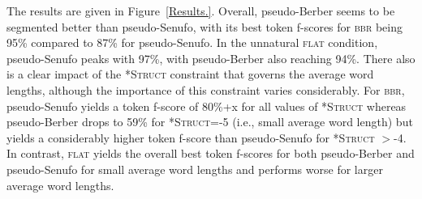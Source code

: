 \documentclass[11pt]{article}
\begin{document}
The results are given in Figure~\ref{Results.}. Overall, pseudo-Berber seems to be segmented better than pseudo-Senufo, with its best token f-scores for \textsc{bbr} being 95\% compared to 87\% for pseudo-Senufo. In the unnatural \textsc{flat} condition, pseudo-Senufo peaks with 97\%, with pseudo-Berber also reaching 94\%. There also is a clear impact of the \textsc{*Struct} constraint that governs the average word lengths, although the importance of this constraint varies considerably. For \textsc{bbr}, pseudo-Senufo yields a token f-score of 80\%+x for all values of \textsc{*Struct} whereas pseudo-Berber drops to 59\% for \textsc{*Struct}=-5 (i.e., small average word length) but yields a considerably higher token f-score than pseudo-Senufo for \textsc{*Struct} $>$-4. In contrast, \textsc{flat} yields the overall best token f-scores for both pseudo-Berber and pseudo-Senufo for small average word lengths and performs worse for larger average word lengths.
\end{document}

